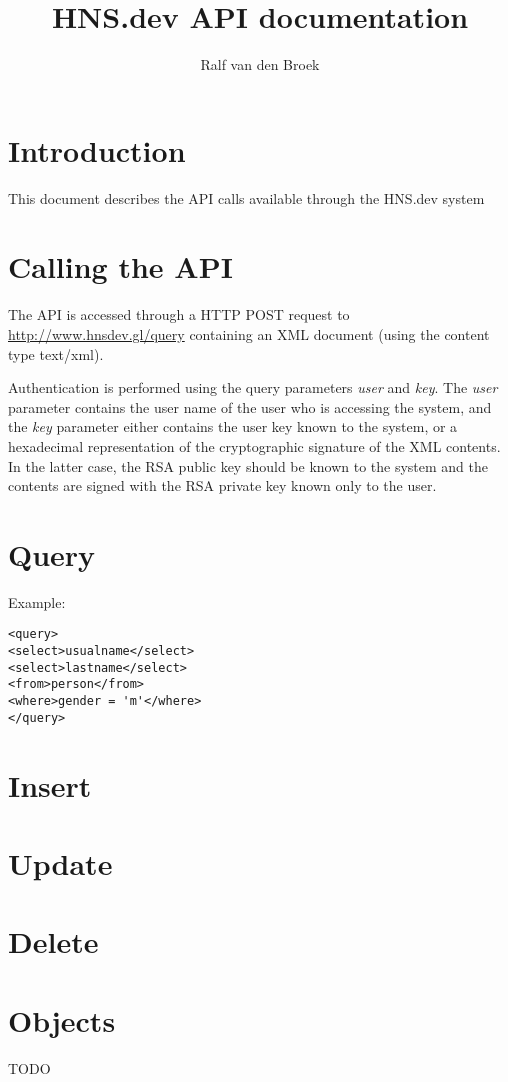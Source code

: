 \documentclass{accepte}
\title{HNS.dev API documentation}
\author{Ralf van den Broek}
\begin{document}
\maketitle
\section{Introduction}
This document describes the API calls available through the HNS.dev system

\section{Calling the API}

The API is accessed through a HTTP POST request to \url{http://www.hnsdev.gl/query} containing
an XML document (using the content type text/xml).

Authentication is performed using the query
parameters \emph{user} and \emph{key}. The \emph{user} parameter contains the user name of the
user who is accessing the system, and the \emph{key} parameter either contains the user key
known to the system, or a hexadecimal representation of the cryptographic signature of the 
XML contents. In the latter case, the RSA public key should be known to the system and the
contents are signed with the RSA private key known only to the user.

\section{Query}

Example:
\begin{verbatim}
<query>
<select>usualname</select>
<select>lastname</select>
<from>person</from>
<where>gender = 'm'</where>
</query>
\end{verbatim}

\section{Insert}

\section{Update}

\section{Delete}

\section{Objects}

TODO
\end{document}
